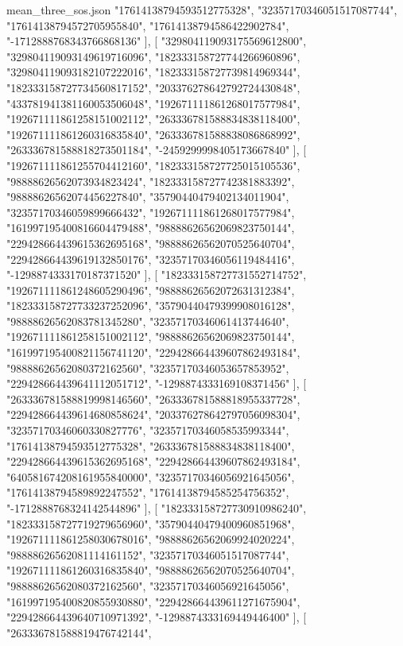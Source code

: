 \begin{filecontents*}[overwrite]{mean_three_sos.json}
    "17614138794593512775328",
    "32357170346051517087744",
    "17614138794572705955840",
    "17614138794586422902784",
    "-1712888768343766868136"
   ],
   [
    "329804119093175569612800",
    "329804119093149619716096",
    "182333158727744266960896",
    "329804119093182107222016",
    "182333158727739814969344",
    "182333158727734560817152",
    "203376278642792724430848",
    "433781941381160053506048",
    "192671111861268017577984",
    "192671111861258151002112",
    "263336781588834838118400",
    "192671111861260316835840",
    "263336781588838086868992",
    "263336781588818273501184",
    "-2459299998405173667840"
   ],
   [
    "192671111861255704412160",
    "182333158727725015105536",
    "98888626562073934823424",
    "182333158727742381883392",
    "98888626562074456227840",
    "35790440479402134011904",
    "32357170346059899666432",
    "192671111861268017577984",
    "161997195400816604479488",
    "98888626562069823750144",
    "229428664439615362695168",
    "98888626562070525640704",
    "229428664439619132850176",
    "32357170346056119484416",
    "-1298874333170187371520"
   ],
   [
    "182333158727731552714752",
    "192671111861248605290496",
    "98888626562072631312384",
    "182333158727733237252096",
    "35790440479399908016128",
    "98888626562083781345280",
    "32357170346061413744640",
    "192671111861258151002112",
    "98888626562069823750144",
    "161997195400821156741120",
    "229428664439607862493184",
    "98888626562080372162560",
    "32357170346053657853952",
    "229428664439641112051712",
    "-1298874333169108371456"
   ],
   [
    "263336781588819998146560",
    "263336781588818955337728",
    "229428664439614680858624",
    "203376278642797056098304",
    "32357170346060330827776",
    "32357170346058535993344",
    "17614138794593512775328",
    "263336781588834838118400",
    "229428664439615362695168",
    "229428664439607862493184",
    "640581674208161955840000",
    "32357170346056921645056",
    "17614138794589892247552",
    "17614138794585254756352",
    "-1712888768324142544896"
   ],
   [
    "182333158727730910986240",
    "182333158727719279656960",
    "35790440479400960851968",
    "192671111861258030678016",
    "98888626562069924020224",
    "98888626562081114161152",
    "32357170346051517087744",
    "192671111861260316835840",
    "98888626562070525640704",
    "98888626562080372162560",
    "32357170346056921645056",
    "161997195400820855930880",
    "229428664439611271675904",
    "229428664439640710971392",
    "-1298874333169449446400"
   ],
   [
    "263336781588819476742144",

\end{filecontents*}
